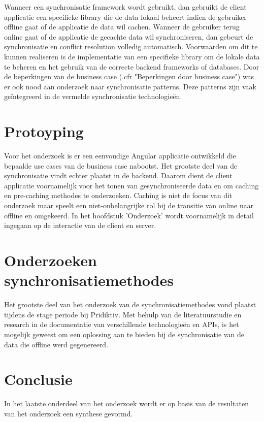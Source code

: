 Wanneer een synchronisatie framework wordt gebruikt, dan gebruikt de client applicatie een specifieke library die de data lokaal beheert indien de gebruiker offline gaat of de applicatie de data wil cachen. Wanneer de gebruiker terug online gaat of de applicatie de gecachte data wil synchroniseren, dan gebeurt de synchronisatie en conflict resolution volledig automatisch. Voorwaarden om dit te kunnen realiseren is de implementatie van een specifieke library om de lokale data te beheren en het gebruik van de correcte backend frameworks of databases.
Door de beperkingen van de business case (.cfr "Beperkingen door business case") was er ook nood aan onderzoek naar synchronisatie patterns. Deze patterns zijn vaak ge\"integreerd in de vermelde synchronisatie technologie\"en.
\clearpage
\section{Protoyping}
Voor het onderzoek is er een eenvoudige Angular applicatie ontwikkeld die bepaalde use cases van de business case nabootst. Het grootste deel van de synchronisatie vindt echter plaatst in de backend. Daarom dient de client applicatie voornamelijk voor het tonen van gesynchroniseerde data en om caching en pre-caching methodes te onderzoeken. Caching is niet de focus van dit onderzoek maar speelt een niet-onbelangrijke rol bij de transitie van online naar offline en omgekeerd. In het hoofdstuk 'Onderzoek' wordt voornamelijk in detail ingegaan op de interactie van de client en server.
\section{Onderzoeken synchronisatiemethodes}
Het grootste deel van het onderzoek van de synchronisatiemethodes vond plaatst tijdens de stage periode bij Pridiktiv. Met behulp van de literatuurstudie en research in de documentatie van verschillende technologie\"en en APIs, is het mogelijk geweest om een oplossing aan te bieden bij de synchronisatie van de data die offline werd gegenereerd.
\section{Conclusie}
In het laatste onderdeel van het onderzoek wordt er op basis van de resultaten van het onderzoek een synthese gevormd.

